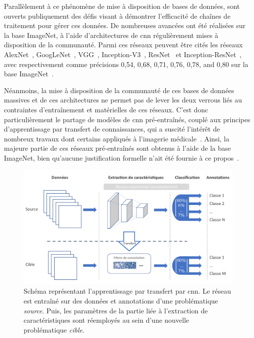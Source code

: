 Parallèlement à ce phénomène de mise à disposition de bases de données, sont ouverts publiquement des défis visant à démontrer l'efficacité de chaînes de traitement pour gérer ces données. De nombreuses avancées ont été réalisées sur la base ImageNet, à l'aide d'architectures de \gls{cnn} régulièrement mises à disposition de la communauté. Parmi ces réseaux peuvent être cités les réseaux AlexNet~\cite{Krizhevsky2012}, GoogLeNet~\cite{Szegedy2015}, VGG~\cite{Simonyan2014}, Inception-V3~\cite{Szegedy2016}, ResNet~\cite{He2016} et Inception-ResNet~\cite{Szegedy2017}, avec respectivement comme précisions 0,54, 0,68, 0,71, 0,76, 0,78, and 0,80 sur la base ImageNet~\cite{Canziani2016}.\par

Néanmoins, la mise à disposition de la communauté de ces bases de données massives et de ces architectures ne permet pas de lever les deux verrous liés au contraintes d'entraînement et matérielles de ces réseaux. C'est donc particulièrement le partage de modèles de \gls{cnn} pré-entraînés, couplé aux principes d'apprentissage par transfert de connaissances, qui a suscité l'intérêt de nombreux travaux dont certains appliqués à l'imagerie médicale~\cite{Litjens2017}. Ainsi, la majeure partie de ces réseaux pré-entraînés sont obtenus à l'aide de la base ImageNet, bien qu'aucune justification formelle n'ait été fournie à ce propos~\cite{Huh2016}.\par
 
\begin{figure}[H]
    \centering
    \includegraphics[width=\linewidth]{contents/chapter_5/resources/scheme_transfer_learning.pdf}
    \caption{Schéma représentant l'apprentissage par transfert par \gls{cnn}. Le réseau est entraîné sur des données et annotations d'une problématique \textit{source}. Puis, les paramètres de la partie liée à l'extraction de caractéristiques sont réemployés au sein d'une nouvelle problématique \textit{cible}.}
    \label{fig:scheme_transfer_learning}
\end{figure}\par

